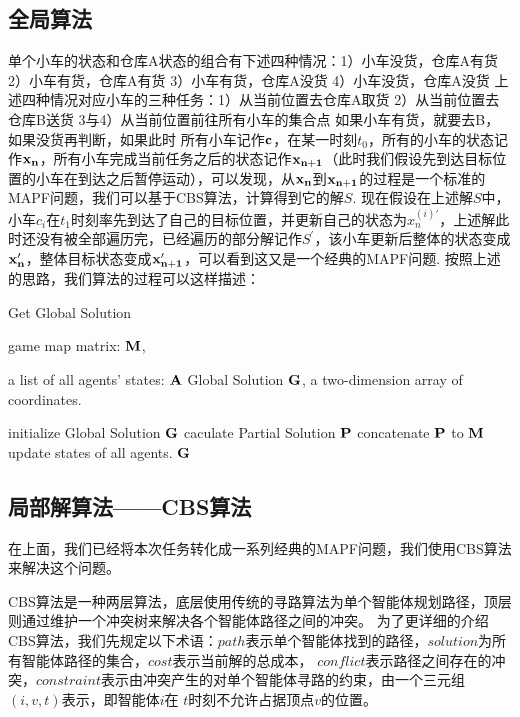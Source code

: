 \documentclass[UTF8]{ctexart}  %
\begin{document}
\subsection{全局算法}
单个小车的状态和仓库A状态的组合有下述四种情况：1）小车没货，仓库A有货 2）小车有货，仓库A有货 3）小车有货，仓库A没货 4）小车没货，仓库A没货
上述四种情况对应小车的三种任务：1）从当前位置去仓库A取货 2）从当前位置去仓库B送货 3与4）从当前位置前往所有小车的集合点
如果小车有货，就要去B，如果没货再判断，如果此时
所有小车记作$\bf c$，在某一时刻$t_0$，所有的小车的状态记作$\bf x_n$，所有小车完成当前任务之后的状态记作$\bf x_{n+1}$（此时我们假设先到达目标位置的小车在到达之后暂停运动），可以发现，从$\bf x_n$到$\bf x_{n+1}$的过程是一个标准的MAPF问题，我们可以基于CBS算法，计算得到它的解$S$.
现在假设在上述解$S$中，小车$c_i$在$t_1$时刻率先到达了自己的目标位置，并更新自己的状态为$\displaystyle x_n^{(i)\prime}$，上述解此时还没有被全部遍历完，已经遍历的部分解记作$S^{\prime}$，该小车更新后整体的状态变成$\bf x_n^{\prime}$，整体目标状态变成$\bf x_{n+1}^{\prime}$，可以看到这又是一个经典的MAPF问题.
按照上述的思路，我们算法的过程可以这样描述：

\begin{algorithm}
    \renewcommand{\algorithmicrequire}{\textbf{Input:}}
	\renewcommand{\algorithmicensure}{\textbf{Output:}}
    \caption{Get Global Solution}
    \label{alg:example}
    \begin{algorithmic}[1]
        \REQUIRE 
            game map matrix: $\bf M$,

            a list of all agents' states: $\bf A$
        \ENSURE
            Global Solution $\bf G$, a two-dimension array of coordinates.

        \STATE initialize Global Solution $\bf G$  
            \STATE caculate Partial Solution $\bf P$
            \STATE concatenate $\bf P $ to $\bf M$
            \STATE update states of all agents.
        \ENDWHILE
        \RETURN $\bf G$
    \end{algorithmic}
\end{algorithm}

\subsection{局部解算法——CBS算法}
在上面，我们已经将本次任务转化成一系列经典的MAPF问题，我们使用CBS算法来解决这个问题。

CBS算法是一种两层算法，底层使用传统的寻路算法为单个智能体规划路径，顶层则通过维护一个冲突树来解决各个智能体路径之间的冲突。
为了更详细的介绍CBS算法，我们先规定以下术语：$path$表示单个智能体找到的路径，$solution$为所有智能体路径的集合，$cost$表示当前解的总成本，
$conflict$表示路径之间存在的冲突，$constraint$表示由冲突产生的对单个智能体寻路的约束，由一个三元组$( i, v, t)$表示，即智能体$i$在
$t$时刻不允许占据顶点$v$的位置。
\end{document}

